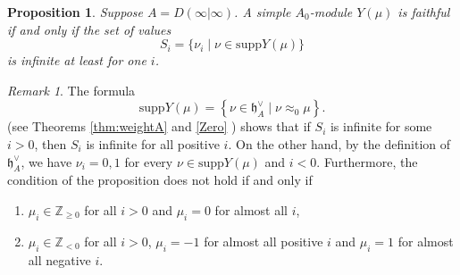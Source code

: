 \documentclass[12pt]{amsart}
\makeatletter
\def\@putname#1#2#3#4{\def\@@ref{#3}\let\old@bf\bf
        \def\bf##1{\old@bf\if?\noexpand##1?{#4}\else##1\fi}%
	#1{#2}%
        \let\bf\old@bf}
\def\@putname#1#2#3#4{\def\@@ref{#3}\let\old@bf\bf	%
	\let\old@reset@font\reset@font			%
        \def\bf##1{\old@bf\if?\noexpand##1?{#4}\else##1\fi}%
	\def\reset@font##1##2{\old@reset@font##1\if?\noexpand##2?{#4}\else##2\fi}#1{#2}%
        \let\bf\old@bf\let\reset@font\old@reset@font}
\let\my@ref=\ref
\def\ref#1{\@putname\my@ref{#1}{#1}{\tiny\rm\@@ref}}
\theoremstyle{plain} %
\numberwithin{equation}{section}
\theoremstyle{definition}
\theoremstyle{remark}
\newtheorem{remark}[definition]{Remark} %
\theoremstyle{plain} %
\newtheorem{proposition}[definition]{Proposition}
\newcommand{\supp}{\mathrm{supp}}
\newcommand{\gh}{\mathfrak{h}}
\def\gh{\mathfrak{h}}
\makeatother
\begin{document}
      \begin{proposition}\label{faithful} Suppose $A=D(\infty|\infty)$. A simple $A_0$-module $Y(\mu)$ is faithful if and only if the set of values $$S_i=\{\nu_i\mid \nu\in \supp Y(\mu)\}$$ is infinite 
        at least for one $i$.
      \end{proposition}
      \begin{remark}\label{remf} The formula
        $$
        \supp Y(\mu) = \left\{ \nu \in \gh_A^{\vee} \; | \; \nu \approx_0 \mu \right\}.
        $$
        (see Theorems \ref{thm:weightA} and  \ref{Zero}) shows that if $S_i$ is infinite for some $i>0$, then $S_i$ is infinite for all positive $i$. On the other hand, by the definition of $\gh_A^{\vee}$, we have $\nu_i=0,1$ for every $\nu\in\supp Y(\mu)$ and $i<0$.
        Furthermore, the condition of the proposition does not hold if and only if
        \begin{enumerate}
        \item $\mu_i\in \mathbb Z_{\geq 0}$ for all $i>0$ and $\mu_i=0$ for almost all $i$,
          \item $\mu_i\in\mathbb Z_{<0}$ for all $i>0$, $\mu_i=-1$ for almost all positive $i$ and $\mu_i=1$ for almost all negative $i$.
          \end{enumerate}
      \end{remark}
\end{document}
